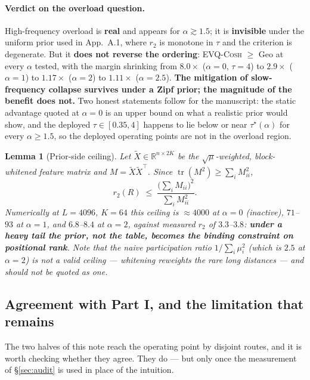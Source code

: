 \documentclass[11pt]{article}
\newtheorem{lemma}[theorem]{Lemma}
\theoremstyle{definition}
\newcommand{\evq}{\textsc{EVQ-Cosh}}
\newcommand{\R}{\mathbb{R}}
\DeclareMathOperator{\tr}{tr}
\begin{document}
\paragraph{Verdict on the overload question.} High-frequency overload is \textbf{real} and appears
for $\alpha\gtrsim1.5$; it is \textbf{invisible} under the uniform prior used in App.~A.1, where
$r_2$ is monotone in $\tau$ and the criterion is degenerate. But it \textbf{does not reverse the
ordering}: \evq{} $\ge$ Geo at every $\alpha$ tested, with the margin shrinking from $8.0\times$
($\alpha{=}0$, $\tau{=}4$) to $2.9\times$ ($\alpha{=}1$) to $1.17\times$ ($\alpha{=}2$) to
$1.11\times$ ($\alpha{=}2.5$). \textbf{The mitigation of slow-frequency collapse survives under a
Zipf prior; the magnitude of the benefit does not.} Two honest statements follow for the manuscript:
the static advantage quoted at $\alpha{=}0$ is an upper bound on what a realistic prior would show,
and the deployed $\tau\in[0.35,4]$ happens to lie below or near $\tau^\star(\alpha)$ for every
$\alpha\ge1.5$, so the deployed operating points are not in the overload region.

\begin{lemma}[Prior-side ceiling]\label{lem:ceiling}
Let $\tilde X\in\R^{n\times2K}$ be the $\sqrt{\mu}$-weighted, block-whitened feature matrix and
$M=\tilde X\tilde X^\top$. Since $\tr(M^2)\ge\sum_iM_{ii}^2$,
\begin{equation}
r_2(R)\;\le\;\frac{\bigl(\sum_iM_{ii}\bigr)^2}{\sum_iM_{ii}^2}.
\end{equation}
Numerically at $L{=}4096$, $K{=}64$ this ceiling is $\approx4000$ at $\alpha{=}0$ (inactive),
$71$--$93$ at $\alpha{=}1$, and $6.8$--$8.4$ at $\alpha{=}2$, against measured $r_2$ of $3.3$--$3.8$:
\textbf{under a heavy tail the prior, not the table, becomes the binding constraint on positional
rank}. Note that the naive participation ratio $1/\sum_i\mu_i^2$ (which is $2.5$ at $\alpha{=}2$)
is \emph{not} a valid ceiling --- whitening reweights the rare long distances --- and should not be
quoted as one.
\end{lemma}

\subsection{Agreement with Part I, and the limitation that remains}
\label{sec:conflict}

The two halves of this note reach the operating point by disjoint routes, and it is worth checking
whether they agree. They do --- but only once the measurement of \S\ref{sec:audit} is used in place
of the intuition.
\end{document}
